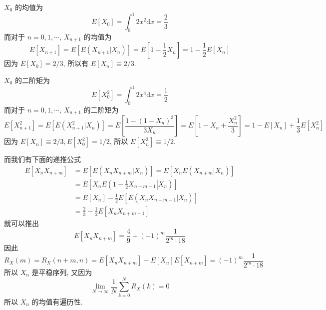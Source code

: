 \documentclass[boxes]{homework}
\begin{document}
\begin{solution}
    $X_0$ 的均值为
    \begin{equation}
        E[X_0] = \int_0^1 2x^2\mathrm{d}x = \frac{2}{3}
    \end{equation}
    而对于 $n = 0, 1, \cdots$, $X_{n+1}$ 的均值为
    \begin{equation}
        E[X_{n+1}] = E[E(X_{n+1}|X_n)] = E\left[1-\frac{1}{2}X_n\right]=1-\frac{1}{2}E[X_n]
    \end{equation}
    因为 $E[X_0] = 2/3$, 所以有 $E[X_n]\equiv 2/3$.

    $X_0$ 的二阶矩为
    \begin{equation}
        E[X^2_0] = \int_0^1 2x^4\mathrm{d}x = \frac{1}{2}
    \end{equation}
    而对于 $n = 0, 1, \cdots$, $X_{n+1}$ 的二阶矩为
    \begin{equation}
        E[X^2_{n+1}] = E[E(X^2_{n+1}|X_n)] = E\left[\frac{1-(1-X_n)^3}{3X_n}\right] = E\left[1-X_n+\frac{X_n^2}{3}\right] = 1 - E[X_n] + \frac{1}{3}E[X^2_n]
    \end{equation}
    因为 $E[X_n] \equiv 2/3, E[X^2_0] = 1/2$, 所以 $E[X^2_n] \equiv 1/2$.

    而我们有下面的递推公式
    \begin{equation}
        \begin{aligned}
            E[X_nX_{n+m}] & = E\left[E\left(X_nX_{n+m}\vert X_n\right)\right] = E\left[X_nE\left(X_{n+m}\vert X_n\right)\right] \\
                          & = E\left[X_nE\left(\left. 1-\frac{1}{2}X_{n+m-1}\right\rvert X_n\right)\right]                      \\
                          & = E[X_n] - \frac{1}{2}E[E\left(X_nX_{n+m-1}\vert X_n\right)]                                        \\
                          & = \frac{2}{3} - \frac{1}{2}E[X_nX_{n+m-1}]
        \end{aligned}
    \end{equation}
    就可以推出
    \begin{equation}
        E[X_nX_{n+m}] = \frac{4}{9} + (-1)^m\frac{1}{2^m\cdot 18}
    \end{equation}
    因此
    \begin{equation}
        R_X(m) = R_X(n+m,n) = E[X_nX_{n+m}] - E[X_n]E[X_{n+m}] = (-1)^m\frac{1}{2^m\cdot 18}
    \end{equation}
    所以 $X_n$ 是平稳序列, 又因为
    \begin{equation}
        \lim_{N \to \infty} \frac{1}{N}\sum_{k = 0}^NR_X(k) = 0
    \end{equation}
    所以 $X_n$ 的均值有遍历性.
\end{solution}
\end{document}
